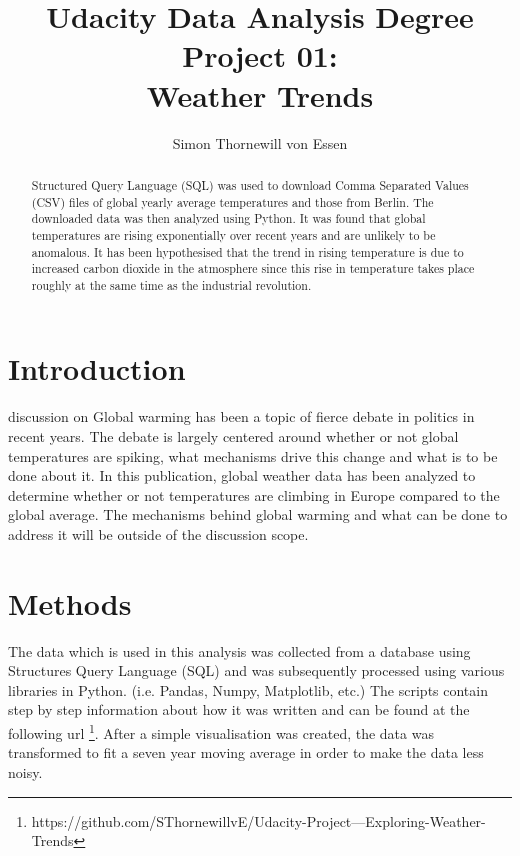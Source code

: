 \documentclass[journal, a4paper]{IEEEtran}
\begin{document}
	\title{Udacity Data Analysis Degree Project 01: \\ Weather Trends}
	\author{Simon Thornewill von Essen}
	\maketitle

\begin{abstract}
	Structured Query Language (SQL)  was used to download Comma Separated Values (CSV) files of global yearly average temperatures and those from Berlin. The downloaded data was then analyzed using Python. It was found that global temperatures are rising exponentially over recent years and are unlikely to be anomalous. It has been hypothesised that the trend in rising temperature is due to increased carbon dioxide in the atmosphere since this rise in temperature takes place roughly at the same time as the industrial revolution.
\end{abstract}

\section{Introduction}
	 discussion on Global warming has been a topic of fierce debate in politics in recent years. The debate is largely centered around whether or not global temperatures are spiking, what mechanisms drive this change and what is to be done about it. In this publication, global weather data has been analyzed to determine whether or not temperatures are climbing in Europe compared to the global average. The mechanisms behind global warming and what can be done to address it will be outside of the discussion scope.
    
	\section{Methods}    
    
    The data which is used in this analysis was collected from a database using Structures Query Language (SQL) and was subsequently processed using various libraries in Python. (i.e. Pandas, Numpy, Matplotlib, etc.) The scripts contain step by step information about how it was written and can be found at the following url \footnote{https://github.com/SThornewillvE/Udacity-Project---Exploring-Weather-Trends}. After a simple visualisation was created, the data was transformed to fit a seven year moving average in order to make the data less noisy.
\end{document}
